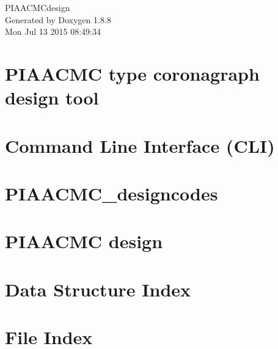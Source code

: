 \documentclass[twoside]{book}
\newcommand{\+}{\discretionary{\mbox{\scriptsize$\hookleftarrow$}}{}{}}
\newcommand{\clearemptydoublepage}{%
  \newpage{\pagestyle{empty}\cleardoublepage}%
}
\begin{document}
\hypersetup{pageanchor=false,
             bookmarks=true,
             bookmarksnumbered=true,
             pdfencoding=unicode
            }
\begin{titlepage}
\vspace*{7cm}
\begin{center}%
{\Large P\+I\+A\+A\+C\+M\+Cdesign }\\
\vspace*{1cm}
{\large Generated by Doxygen 1.8.8}\\
\vspace*{0.5cm}
{\small Mon Jul 13 2015 08:49:34}\\
\end{center}
\end{titlepage}
\clearemptydoublepage
\tableofcontents
\clearemptydoublepage
{}
\hypersetup{pageanchor=true}

\chapter{P\+I\+A\+A\+C\+M\+C type coronagraph design tool}
\label{md_README}
\hypertarget{md_README}{}

\chapter{Command Line Interface (C\+L\+I)}
\label{md_src_CLIcore}
\hypertarget{md_src_CLIcore}{}

\chapter{P\+I\+A\+A\+C\+M\+C\+\_\+designcodes}
\label{md_src_PIAACMCsimul_PIAACMC_designcodes}
\hypertarget{md_src_PIAACMCsimul_PIAACMC_designcodes}{}

\chapter{P\+I\+A\+A\+C\+M\+C design}
\label{md_src_PIAACMCsimul_README}
\hypertarget{md_src_PIAACMCsimul_README}{}

\chapter{Data Structure Index}

\chapter{File Index}

\end{document}
